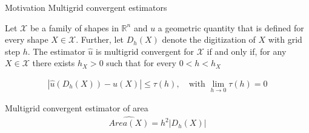 \begin{frame}
\begin{minipage}[t][0.65\textheight][t]{1\textwidth}
{\begin{tabular}{ccc}
\end{tabular}}%
\end{minipage}
\end{frame}

\begin{frame}
{Motivation}
{Multigrid convergent estimators}

\begin{definition}
	Let $\mathcal{X}$ be a family of shapes in $\mathbb{R}^n$ and $u$ a geometric quantity that is defined for every shape $X \in \mathcal{X}$. Further, let $D_h(X)$ denote the digitization of $X$ with grid step $h$.%
%
\vspace{1em}	
%	
	 The estimator $\hat{u}$ is multigrid convergent for $\mathcal{X}$ if and only if, for any $X \in \mathcal{X}$ there exists $h_X > 0$ such that for every $0< h < h_X$
	
	\begin{align*}
		| \hat{u}(D_h(X)) - u(X) | \leq \tau(h), \quad \text{with } \lim_{h\rightarrow 0}{\tau(h)} = 0
	\end{align*}	
\end{definition}
%
\pause
%
Multigrid convergent estimator of area
\begin{align*}
	\widehat{Area(X)} = h^2|D_h(X)|
\end{align*}
%
\end{frame}

